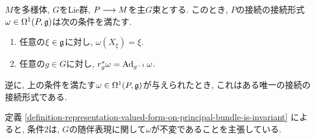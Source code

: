 \begin{thm}
\label{principal-bundle-connection-form-characterization}
$M$を多様体, $G$をLie群,
$P \longrightarrow M$を主$G$束とする.
このとき, $P$の接続の接続形式$\omega \in \Omega^1(P, \mathfrak{g})$は次の条件を満たす.
\begin{enumerate}
\item
任意の$\xi \in \mathfrak{g}$に対し, $\omega(X_\xi) = \xi$.
\item
任意の$g \in G$に対し,
$ r_g^* \omega = \operatorname{Ad}_{g^{-1}} \omega$.
\end{enumerate}
逆に, 上の条件を満たす$\omega \in \Omega^1(P, \mathfrak{g})$が与えられたとき, これはある唯一の接続の接続形式である.
\end{thm}

\begin{rem}
定義
\ref{definition-representation-valued-form-on-principal-bundle-is-invariant}
によると, 条件2は, $G$の随伴表現に関して$\omega$が不変であることを主張している.
\end{rem}

